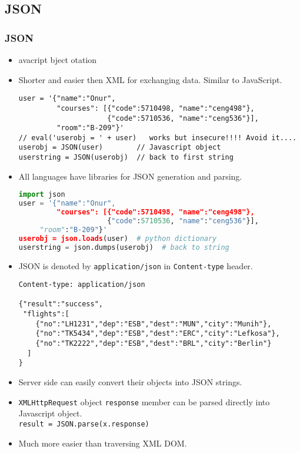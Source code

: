 \documentclass[trans,compress,xcolor=table]{beamer}
\begin{document}
\subsection*{JSON}
\begin{frame}[fragile]
\frametitle{JSON}
\begin{itemize}
\item {}avacript bject otation
\item Shorter and easier then XML for exchanging data. Similar to JavaScript.
\begin{lstlisting}[showstringspaces=false]
user = '{"name":"Onur", 
         "courses": [{"code":5710498, "name":"ceng498"},
                     {"code":5710536, "name":"ceng536"}],
         "room":"B-209"}'           
// eval('userobj = ' + user)   works but insecure!!!! Avoid it....
userobj = JSON(user)		// Javascript object
userstring = JSON(userobj)	// back to first string
\end{lstlisting}
\item All languages have libraries for JSON generation and parsing.
\begin{lstlisting}[language=python,showstringspaces=false]
import json
user = '{"name":"Onur", 
         "courses": [{"code":5710498, "name":"ceng498"},
                     {"code":5710536, "name":"ceng536"}],
	 "room":"B-209"}'           
userobj = json.loads(user)	# python dictionary
userstring = json.dumps(userobj)  # back to string
\end{lstlisting}

\end{itemize}
\end{frame}

\begin{frame}[fragile]
\begin{itemize}
\item JSON is denoted by \lstinline!application/json! in 
	\lstinline!Content-type! header.
\begin{lstlisting}
Content-type: application/json

{"result":"success",
 "flights":[ 
    {"no":"LH1231","dep":"ESB","dest":"MUN","city":"Munih"},
    {"no":"TK5434","dep":"ESB","dest":"ERC","city":"Lefkosa"},
    {"no":"TK2222","dep":"ESB","dest":"BRL","city":"Berlin"}
  ]
}
\end{lstlisting}
\item Server side can easily convert their objects into JSON strings.
\item \lstinline!XMLHttpRequest! object \lstinline!response!
	member can be parsed directly into Javascript object.\\
 \lstinline!result = JSON.parse(x.response)!
\item Much more easier than traversing XML DOM.
\end{itemize}
\end{frame}
\end{document}
